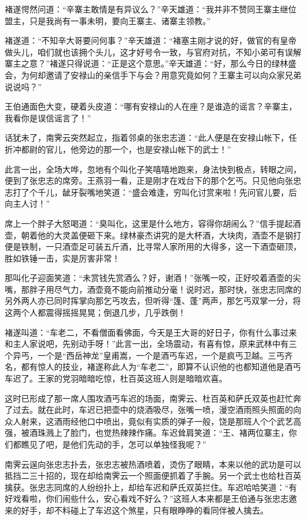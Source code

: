 \documentclass[12pt,oneside]{book}
\begin{document}
褚遂愕然问道：``辛寨主敢情是有异议么？''辛天雄道：``我并非不赞同王寨主继位盟主，只是我尚有一事未明，要向王寨主、诸寨主领教。''

褚遂道：``不知辛大哥要问何事？''辛天雄道：``褚塞主刚才说的好，做官的有皇帝做头儿，咱们就也该拥个头儿，这才好号令一致，与官府对抗，不知小弟可有误解寨主之意？''褚遂只得说道：``正是这个意思。''辛天雄道：``好，那么今日的绿林盛会，为何却邀请了安禄山的亲信手下与会？用意究竟如何？王寨主可以向众家兄弟说说吗？''

王伯通面色大变，硬着头皮道：``哪有安禄山的人在座？是谁造的谣言？辛寨主，我看你是误信谣言了！''

话犹未了，南霁云突然起立，指着邻桌的张忠志道：``此人便是在安禄山帐下，任折冲都尉的官儿，他旁边的那一个，也是安禄山帐下的武士！''

此言一出，全场大哗，忽地有个叫化子笑嘻嘻地跑来，身法快到极点，转眼之间，便到了张忠志的席旁。王燕羽一看，正是刚才在戏台下的那个乞丐。只见他向张忠志打了个千儿，龇牙裂嘴地笑道：``盛会难逢，穷叫化讨赏来啦！先问官儿要，后向主人讨！''

席上一个胖子大怒喝道：``臭叫化，这里是什么地方，容得你胡闹么？''信手提起酒壶，朝着他的大灵盖便砸下来。绿林豪杰讲究的是大杯酒，大块肉，酒壶不是钢打便是铁制，一只酒壶足可装五斤酒，比寻常人家所用的大得多，这一下酒壶砸顶，胜如铁锤一击，实是厉害非常！

那叫化子迎面笑道：``未赏钱先赏酒么？好，谢酒！''张嘴一咬，正好咬着酒壶的尖嘴，那胖子用尽气力，酒壶竟不能向前推动分毫！说时迟，那时快，张忠志同席的另外两人亦已同时挥掌向那乞丐攻去，但听得``篷、蓬''两声，那乞丐双掌一分，将这两个人都震得摇摇晃晃；倒退几步，几乎跌倒！

褚遂叫道：``车老二，不看僧面看佛面，今天是王大哥的好日子，你有什么事过来和主人家说吧，先别动手呀！''此言一出，全场震动，有喜有惊，原来武林中有三个异丐，一个是``西岳神龙''皇甫嵩，一个是酒丐车迟，一个是疯丐卫越。三丐齐名，都有惊人的技业，褚遂称此人为``车老二''，即算不认识他的也都知道他是酒丐车迟了。王家的党羽暗暗吃惊，杜百英这班人则是暗暗欢喜。

这时已形成了那一席人围攻酒丐车迟的场面，南霁云、杜百英和萨氏双英也赶忙奔了过去。就在此时，车迟已把壶中的烧酒吸尽，张嘴一喷，漫空酒雨照头照面的向众人射来，这酒雨经他口中喷出，竟似有实质的弹子一般，饶是那班人个个武艺高强，被酒珠溅上了脸门，也觉热辣辣作痛。车迟耸肩笑道：``王、褚两位寨主，你们都瞧见了吧，是他们先动的手，怎可以单独怪我呢？''

南霁云逞向张忠志扑去，张忠志被热酒喷着，烫伤了眼睛，本来以他的武功是可以抵挡二三十招的，现在却给南霁云一个照面便抓着了手腕。另一个武士也给杜百英擒获。张忠志同席的人纷纷扑上，却给车迟和萨氏双英拦住。车迟哈哈笑道：``有好戏看啦，你们闹些什么，安心看戏不好么？''这班人本来都是王伯通与张忠志邀来的好手，却不料碰上了车迟这个煞星，只有眼睁睁的看同伴被人擒去。
\end{document}
